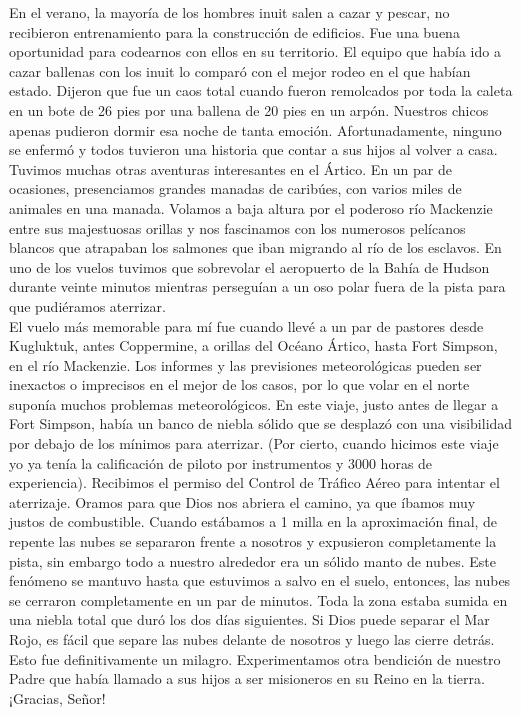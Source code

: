 \documentclass[twoside, 12pt]{book}
\begin{document}
En el verano, la mayoría de los hombres inuit salen a cazar y pescar, no recibieron entrenamiento para la construcción de edificios. Fue una buena oportunidad para codearnos con ellos en su territorio. El equipo que había ido a cazar ballenas con los inuit lo comparó con el mejor rodeo en el que habían estado. Dijeron que fue un caos total cuando fueron remolcados por toda la caleta en un bote de 26 pies por una ballena de 20 pies en un arpón. Nuestros chicos apenas pudieron dormir esa noche de tanta emoción. Afortunadamente, ninguno se enfermó y todos tuvieron una historia que contar a sus hijos al volver a casa.\\

Tuvimos muchas otras aventuras interesantes en el Ártico. En un par de ocasiones, presenciamos grandes manadas de caribúes, con varios miles de animales en una manada. Volamos a baja altura por el poderoso río Mackenzie entre sus majestuosas orillas y nos fascinamos con los numerosos pelícanos blancos que atrapaban los salmones que iban migrando al río de los esclavos. En uno de los vuelos tuvimos que sobrevolar el aeropuerto de la Bahía de Hudson durante veinte minutos mientras perseguían a un oso polar fuera de la pista para que pudiéramos aterrizar.\\
                                         	                
El vuelo más memorable para mí fue cuando llevé a un par de pastores desde Kugluktuk, antes Coppermine, a orillas del Océano Ártico, hasta Fort Simpson, en el río Mackenzie. Los informes y las previsiones meteorológicas pueden ser inexactos o imprecisos en el mejor de los casos, por lo que volar en el norte suponía muchos problemas meteorológicos. En este viaje, justo antes de llegar a Fort Simpson, había un banco de niebla sólido que se desplazó con una visibilidad por debajo de los mínimos para aterrizar. (Por cierto, cuando hicimos este viaje yo ya tenía la calificación de piloto por instrumentos y 3000 horas de experiencia). Recibimos el permiso del Control de Tráfico Aéreo para intentar el aterrizaje. Oramos para que Dios nos abriera el camino, ya que íbamos muy justos de combustible. Cuando estábamos a 1 milla en la aproximación final, de repente las nubes se separaron frente a nosotros y expusieron completamente la pista, sin embargo todo a nuestro alrededor era un sólido manto de nubes. Este fenómeno se mantuvo hasta que estuvimos a salvo en el suelo, entonces, las nubes se cerraron completamente en un par de minutos. Toda la zona estaba sumida en una niebla total que duró los dos días siguientes. Si Dios puede separar el Mar Rojo, es fácil que separe las nubes delante de nosotros y luego las cierre detrás. Esto fue definitivamente un milagro. Experimentamos otra bendición de nuestro Padre que había llamado a sus hijos a ser misioneros en su Reino en la tierra. ¡Gracias, Señor!\\
 
\end{document}

